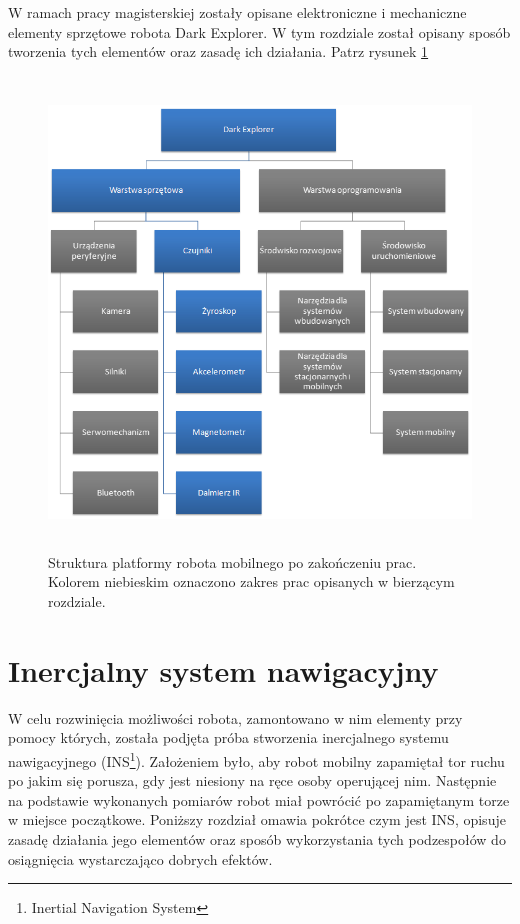 W ramach pracy magisterskiej zostały opisane elektroniczne i mechaniczne elementy
sprzętowe robota Dark Explorer. W tym rozdziale został opisany sposób tworzenia
tych elementów oraz zasadę ich działania. Patrz rysunek
\ref{fig:DarkExplorerPlatformHardware}

\begin{figure}[!ht]
 \centering
 \includegraphics[height=125mm]{../images/ch04/dark_explorer_platform_hardware.png}
 \caption{Struktura platformy robota mobilnego po zakończeniu prac. Kolorem niebieskim oznaczono zakres prac opisanych w bierzącym rozdziale.}
 \label{fig:DarkExplorerPlatformHardware}
\end{figure}

\section{Inercjalny system nawigacyjny}
\label{sec:ins}
W celu rozwinięcia możliwości robota, zamontowano w nim elementy przy pomocy
których, została podjęta próba stworzenia inercjalnego systemu nawigacyjnego
(INS\footnote{Inertial Navigation System}). Założeniem było, aby robot mobilny
zapamiętał tor ruchu po jakim się porusza, gdy jest niesiony na ręce osoby
operującej nim. Następnie na podstawie wykonanych pomiarów robot miał powrócić po
zapamiętanym torze w miejsce początkowe. Poniższy rozdział omawia pokrótce czym
jest INS, opisuje zasadę działania jego elementów oraz sposób wykorzystania tych
podzespołów do osiągnięcia wystarczająco dobrych efektów.

